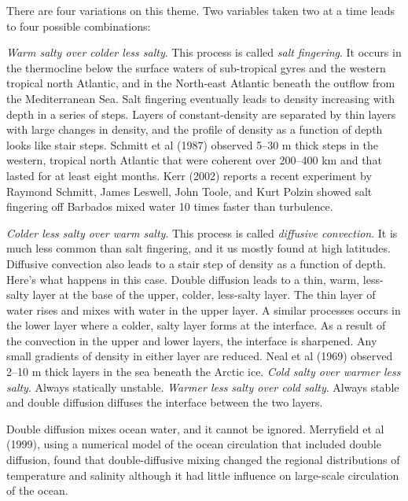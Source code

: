 There are four variations on this theme. Two variables taken two at a time
leads to four possible combinations:
\begin{enumerate}
\vitem \textit{Warm salty over colder less salty}. This process is called
\textit{salt fingering}. It occurs in the thermocline below the surface waters of sub-tropical
gyres and the western tropical north Atlantic, and in the North-east Atlantic beneath the outflow from
the Mediterranean Sea. Salt fingering eventually leads to density increasing with depth
in a series of steps. Layers of constant-density are separated by thin layers with
large changes in density, and the profile of density as a function of depth looks
like stair steps. Schmitt et al (1987) observed 5--30 m thick steps in the western,
tropical north Atlantic that were coherent over 200--400 km and that lasted for at
least eight months. Kerr (2002) reports a recent experiment by Raymond Schmitt,
James Leswell, John Toole, and Kurt Polzin showed salt fingering off Barbados
mixed water 10 times faster than turbulence.  

\vitem \textit{Colder less salty over warm salty}.  This process is called
\textit{diffusive convection}. It is much less
common than salt fingering, and it us mostly found at high latitudes. Diffusive
convection also leads to a stair step of density as a function of depth. Here's
what happens in this case. Double diffusion leads to a thin, warm, less-salty layer
at the base of the upper, colder, less-salty layer. The thin layer of water rises
and mixes with water in the upper layer. A similar processes occurs in the lower
layer where a colder, salty layer forms at the interface. As a result of the
convection in the upper and lower layers, the interface is sharpened. Any small
gradients of density in either layer are reduced. Neal et al (1969) observed 2--10
m thick layers in the sea beneath the Arctic ice. \vitem \textit{Cold salty over
warmer less salty}. Always statically unstable. \vitem \textit{Warmer less salty
over cold salty}. Always stable and double diffusion diffuses the interface between
the two layers.
\end{enumerate}

Double diffusion mixes ocean water, and it cannot be ignored. Merryfield et al
(1999), using a numerical model of the ocean circulation that included double
diffusion, found that double-diffusive mixing changed the
regional distributions of temperature and salinity although it had little
influence on large-scale circulation of the ocean.

